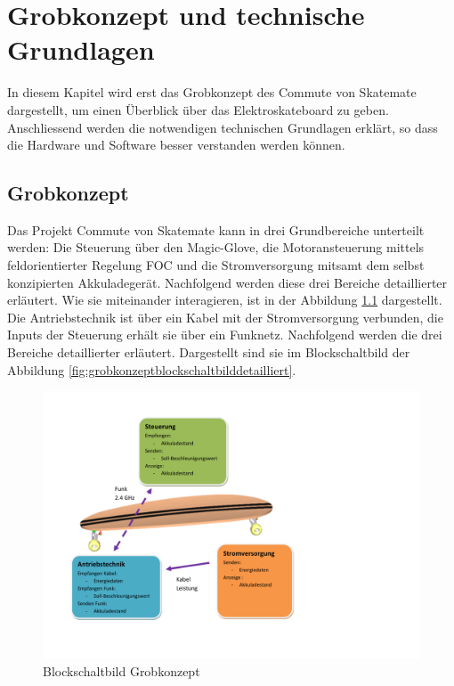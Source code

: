 \chapter{Grobkonzept und technische Grundlagen}
\label{TechnischeGrundlagen}
In diesem Kapitel wird erst das Grobkonzept des Commute von Skatemate dargestellt, um einen Überblick über das Elektroskateboard zu geben.
Anschliessend werden die notwendigen technischen Grundlagen erklärt, so dass die Hardware und Software besser verstanden werden können.


\section{Grobkonzept}
\label{Grobkonzept}
Das Projekt Commute von Skatemate kann in drei Grundbereiche unterteilt werden: Die Steuerung über den Magic-Glove, die Motoransteuerung mittels feldorientierter Regelung FOC und die Stromversorgung mitsamt dem selbst konzipierten Akkuladegerät. Nachfolgend werden diese drei Bereiche detaillierter erläutert. Wie sie miteinander interagieren, ist in der Abbildung \ref{fig:grobkonzeptblockschaltbildgrob} dargestellt. Die Antriebstechnik ist über ein Kabel mit der Stromversorgung verbunden, die Inputs der Steuerung erhält sie über ein Funknetz. Nachfolgend werden die drei Bereiche detaillierter erläutert. Dargestellt sind sie im Blockschaltbild der Abbildung \ref{fig:grobkonzeptblockschaltbilddetailliert}. 
\begin{figure}[H]
	\centering
	\includegraphics[width=0.8\linewidth, keepaspectratio]{images/Grobkonzept_Blockschaltbild_grob}
	\caption[Blockschaltbild Grobkonzept]{Blockschaltbild Grobkonzept}
	\label{fig:grobkonzeptblockschaltbildgrob}
\end{figure}

